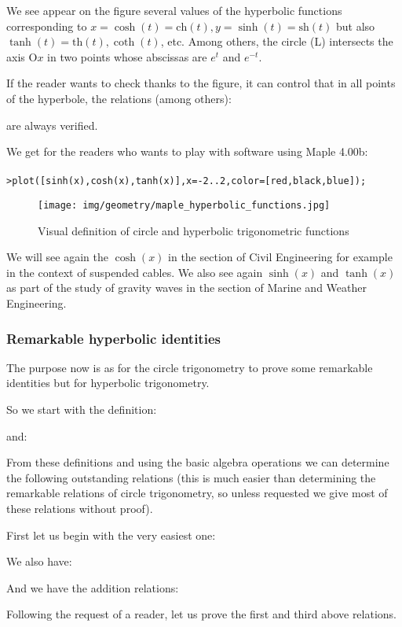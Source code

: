 	We see appear on the figure several values of the hyperbolic functions corresponding to $x=\cosh(t)=\text{ch}(t),y=\sinh(t)=\text{sh}(t)$ but also $\tanh(t)=\text{th}(t),\coth(t)$, etc. Among others, the circle (L) intersects the axis $\text{O}x$ in two points whose abscissas are $e^t$ and $e^{-t}$.
	
	If the reader wants to check thanks to the figure, it can control that in all points of the  hyperbole, the relations (among others):
	
	are always verified.
	
	We get for the readers who wants to play with software using Maple 4.00b:\\\\
		\texttt{>plot([sinh(x),cosh(x),tanh(x)],x=-2..2,color=[red,black,blue]);}
	
	\begin{figure}[H]
	\centering
	\texttt{[image: img/geometry/maple\_hyperbolic\_functions.jpg]}
	\caption{Visual definition of circle and hyperbolic trigonometric functions}
	\end{figure}
	We will see again the $\cosh(x)$ in the section of Civil Engineering for example in the context of suspended cables. We also see again $\sinh (x)$ and $\tanh (x)$ as part of the study of gravity waves in the section of Marine and Weather Engineering.
	
	\subsubsection{Remarkable hyperbolic identities}
	
	The purpose now is as for the circle trigonometry to prove some remarkable identities but for hyperbolic trigonometry.
	
	So we start with the definition:
	
	and:
	
	From these definitions and using the basic algebra operations we can determine the following outstanding relations (this is much easier than determining the remarkable relations of circle trigonometry, so unless requested we give most of these relations without proof).
	
	First let us begin with the very easiest one:
	
	We also have:
	
	And we have the addition relations:
	
	Following the request of a reader, let us prove the first and third above relations.
	
